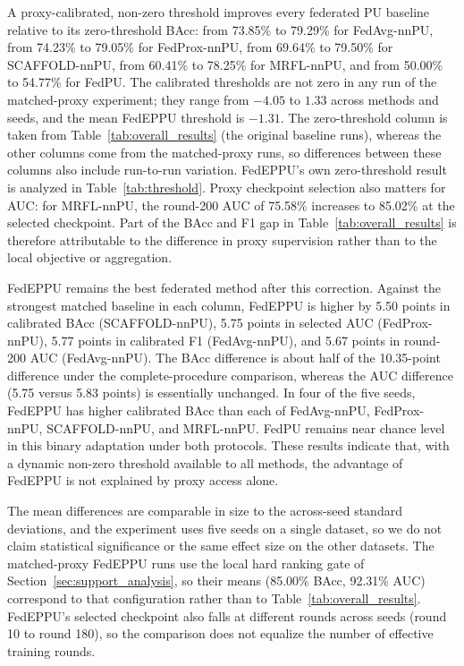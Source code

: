 \documentclass[lettersize,journal]{IEEEtran}
\begin{document}
A proxy-calibrated, non-zero threshold improves every federated PU baseline relative to its zero-threshold BAcc: from 73.85\% to 79.29\% for FedAvg-nnPU, from 74.23\% to 79.05\% for FedProx-nnPU, from 69.64\% to 79.50\% for SCAFFOLD-nnPU, from 60.41\% to 78.25\% for MRFL-nnPU, and from 50.00\% to 54.77\% for FedPU. The calibrated thresholds are not zero in any run of the matched-proxy experiment; they range from $-4.05$ to $1.33$ across methods and seeds, and the mean FedEPPU threshold is $-1.31$. The zero-threshold column is taken from Table~\ref{tab:overall_results} (the original baseline runs), whereas the other columns come from the matched-proxy runs, so differences between these columns also include run-to-run variation. FedEPPU's own zero-threshold result is analyzed in Table~\ref{tab:threshold}. Proxy checkpoint selection also matters for AUC: for MRFL-nnPU, the round-200 AUC of 75.58\% increases to 85.02\% at the selected checkpoint. Part of the BAcc and F1 gap in Table~\ref{tab:overall_results} is therefore attributable to the difference in proxy supervision rather than to the local objective or aggregation.

FedEPPU remains the best federated method after this correction. Against the strongest matched baseline in each column, FedEPPU is higher by 5.50 points in calibrated BAcc (SCAFFOLD-nnPU), 5.75 points in selected AUC (FedProx-nnPU), 5.77 points in calibrated F1 (FedAvg-nnPU), and 5.67 points in round-200 AUC (FedAvg-nnPU). The BAcc difference is about half of the 10.35-point difference under the complete-procedure comparison, whereas the AUC difference (5.75 versus 5.83 points) is essentially unchanged. In four of the five seeds, FedEPPU has higher calibrated BAcc than each of FedAvg-nnPU, FedProx-nnPU, SCAFFOLD-nnPU, and MRFL-nnPU. FedPU remains near chance level in this binary adaptation under both protocols. These results indicate that, with a dynamic non-zero threshold available to all methods, the advantage of FedEPPU is not explained by proxy access alone.

The mean differences are comparable in size to the across-seed standard deviations, and the experiment uses five seeds on a single dataset, so we do not claim statistical significance or the same effect size on the other datasets. The matched-proxy FedEPPU runs use the local hard ranking gate of Section~\ref{sec:support_analysis}, so their means (85.00\% BAcc, 92.31\% AUC) correspond to that configuration rather than to Table~\ref{tab:overall_results}. FedEPPU's selected checkpoint also falls at different rounds across seeds (round 10 to round 180), so the comparison does not equalize the number of effective training rounds.
\end{document}
